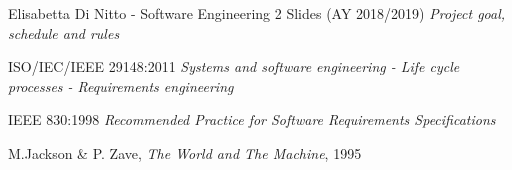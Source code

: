 \begin{thebibliography}{9}

  Elisabetta Di Nitto - Software Engineering 2 Slides (AY 2018/2019) \emph{Project goal, schedule and rules}

	ISO/IEC/IEEE 29148:2011 \emph{Systems and software engineering - Life cycle processes - Requirements engineering}

	IEEE 830:1998 \emph{Recommended Practice for Software Requirements Specifications}

  M.Jackson \& P. Zave, \emph{The World and The Machine}, 1995

\end{thebibliography}
